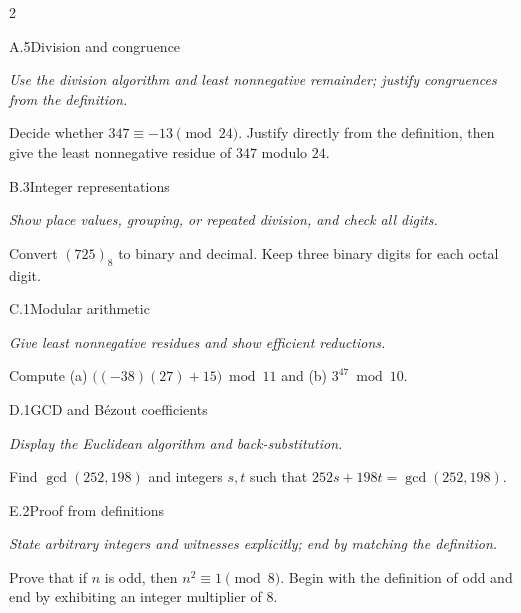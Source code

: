 \documentclass[9pt]{extarticle}
\begin{document}
\begin{multicols}{2}
\begin{CoreProblem}{A.5}{Division and congruence}
{\scriptsize\textit{Use the division algorithm and least nonnegative remainder; justify congruences from the definition.}\par}
Decide whether $347\equiv-13\pmod{24}$. Justify directly from the definition,
then give the least nonnegative residue of $347$ modulo $24$.
\end{CoreProblem}
\begin{CoreProblem}{B.3}{Integer representations}
{\scriptsize\textit{Show place values, grouping, or repeated division, and check all digits.}\par}
Convert $(725)_8$ to binary and decimal. Keep three binary digits for each
octal digit.
\end{CoreProblem}
\begin{CoreProblem}{C.1}{Modular arithmetic}
{\scriptsize\textit{Give least nonnegative residues and show efficient reductions.}\par}
Compute (a) $\bigl((-38)(27)+15\bigr)\bmod11$ and
(b) $3^{47}\bmod10$.
\end{CoreProblem}
\columnbreak
\begin{CoreProblem}{D.1}{GCD and B\'ezout coefficients}
{\scriptsize\textit{Display the Euclidean algorithm and back-substitution.}\par}
Find $\gcd(252,198)$ and integers $s,t$ such that
$252s+198t=\gcd(252,198)$.
\end{CoreProblem}
\begin{CoreProblem}{E.2}{Proof from definitions}
{\scriptsize\textit{State arbitrary integers and witnesses explicitly; end by matching the definition.}\par}
Prove that if $n$ is odd, then $n^2\equiv1\pmod{8}$. Begin with the definition
of odd and end by exhibiting an integer multiplier of $8$.
\end{CoreProblem}
\end{multicols}
\CoreWorkArea
\FormBreak
{}
\end{document}

